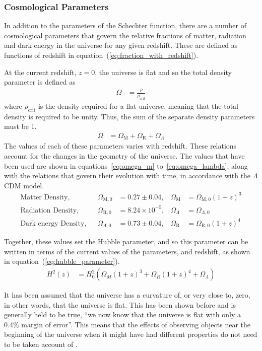 	\subsubsection{Cosmological Parameters} %
	\label{ssub:cosmological_parameters}
		In addition to the parameters of the Schechter function, there are a number of cosmological parameters that govern the relative fractions of matter, radiation and dark energy in the universe for any given redshift. These are defined as functions of redshift in equation~(\ref{eq:fraction_with_redshift}).

		At the current redshift, $z=0$, the universe is flat and so the total density parameter is defined as
		\begin{align}
			\Omega &= \frac{\rho}{\rho_{\text{crit}}}
		\end{align}
		where $\rho_{\text{crit}}$ is the density required for a flat universe, meaning that the total density is required to be unity. Thus, the sum of the separate density parameters must be 1.
		\begin{align}
			\Omega &= \Omega_\text{M} + \Omega_\text{R} + \Omega_\Lambda \label{eq:fraction_with_redshift}
		\end{align}
		The values of each of these parameters varies with redshift. These relations account for the changes in the geometry of the universe. The values that have been used are shown in equations~\ref{eq:omega_m} to~\ref{eq:omega_lambda}, along with the relations that govern their evolution with time, in accordance with the $\Lambda$CDM model\cite{modern_astrophysics_bradley}.
		\begin{align}
			\text{Matter Density}, 		&& \Omega_{\text{M},0} 	&= 0.27\pm 0.04,			& \Omega_\text{M} &= \Omega_{\text{M},0}{(1+z)}^3 \label{eq:omega_m}\\
			\text{Radiation Density}, 	&& \Omega_{\text{R},0}	&= 8.24\times 10^{-5}, 	& \Omega_\Lambda  &= \Omega_{\Lambda,0} \label{eq:omega_r}\\
			\text{Dark energy Density}, 	&& \Omega_{\Lambda,0} 	&= 0.73\pm 0.04,			& \Omega_\text{R} &= \Omega_{\text{R},0}{(1+z)}^4 \label{eq:omega_lambda}
		\end{align}

		Together, these values set the Hubble parameter, and so this parameter can be written in terms of the current values of the parameters, and redshift, as shown in equation~(\ref{eq:hubble_parameter})\cite{hubble_parameter_astro_journal}.
		\begin{align}
	        H^2(z) &= H_0^2\left( \Omega_M {(1+z)}^3 + \Omega_R {(1+z)}^4 + \Omega_{\Lambda} \right) \label{eq:hubble_parameter}
    	\end{align}

    	It has been assumed that the universe has a curvature of, or very close to, zero\cite{1102.4485}, in other words, that the universe is flat. This has been shown before and is generally held to be true, ``we now know that the universe is flat with only a 0.4\% margin of error''\cite{nasa_uni_shape}. This means that the effects of observing objects near the beginning of the universe when it might have had different properties do not need to be taken account of .
